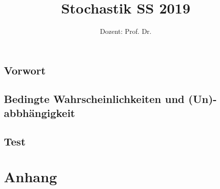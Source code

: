 \documentclass[ngerman,a4paper,order=firstname]{../../texmf/tex/latex/mathscript/mathscript}
\title{\textbf{Stochastik SS 2019}}
\author{Dozent: Prof. Dr. \person{Anita Behme}}
\begin{document}
\pagestyle{plain}

\maketitle

\hypertarget{tocpage}{}
\tableofcontents
{}

\pagebreak
{}
\pagestyle{fancy}

\chapter*{Vorwort}





\chapter[Bedingte Wkeiten und (Un-)abbhängigkeit]{Bedingte Wahrscheinlichkeiten und (Un)-abbhängigkeit}



\chapter{Test}


\part*{Anhang}
\appendix

\nocite{*}




\printindex
\end{document}

